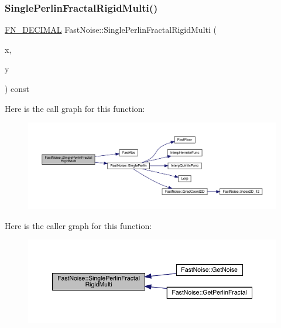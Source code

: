 \subsubsection{\texorpdfstring{Single\+Perlin\+Fractal\+Rigid\+Multi()}{SinglePerlinFractalRigidMulti()}\hspace{0.1cm}{\footnotesize\ttfamily [1/2]}}
{\footnotesize\ttfamily \mbox{\hyperlink{_fast_noise_8h_a75a9ef6d2541c4921815b885bfd449c3}{F\+N\+\_\+\+D\+E\+C\+I\+M\+AL}} Fast\+Noise\+::\+Single\+Perlin\+Fractal\+Rigid\+Multi (\begin{DoxyParamCaption}\item[{\mbox{\hyperlink{_fast_noise_8h_a75a9ef6d2541c4921815b885bfd449c3}{F\+N\+\_\+\+D\+E\+C\+I\+M\+AL}}}]{x,  }\item[{\mbox{\hyperlink{_fast_noise_8h_a75a9ef6d2541c4921815b885bfd449c3}{F\+N\+\_\+\+D\+E\+C\+I\+M\+AL}}}]{y }\end{DoxyParamCaption}) const\hspace{0.3cm}{\ttfamily [private]}}

Here is the call graph for this function\+:
\nopagebreak
\begin{figure}[H]
\begin{center}
\leavevmode
\includegraphics[width=350pt]{class_fast_noise_a20d9ce6e0bd7730ac242e7de5fda0541_cgraph}
\end{center}
\end{figure}
Here is the caller graph for this function\+:
\nopagebreak
\begin{figure}[H]
\begin{center}
\leavevmode
\includegraphics[width=350pt]{class_fast_noise_a20d9ce6e0bd7730ac242e7de5fda0541_icgraph}
\end{center}
\end{figure}
\mbox{\label{class_fast_noise_ad5d0bbafb8bc1e07c3d771455736600d}} 
